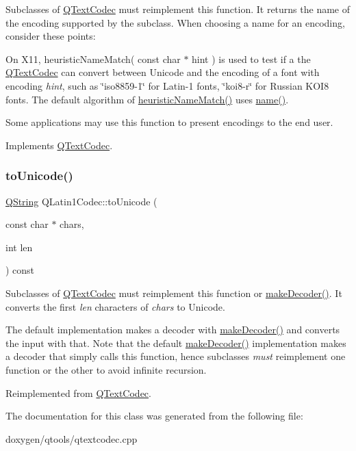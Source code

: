 Subclasses of \mbox{\hyperlink{class_q_text_codec}{Q\+Text\+Codec}} must reimplement this function. It returns the name of the encoding supported by the subclass. When choosing a name for an encoding, consider these points\+: 
\begin{DoxyItemize}
\item On X11, heuristic\+Name\+Match( const char $\ast$ hint ) is used to test if a the \mbox{\hyperlink{class_q_text_codec}{Q\+Text\+Codec}} can convert between Unicode and the encoding of a font with encoding {\itshape hint}, such as \char`\"{}iso8859-\/1\char`\"{} for Latin-\/1 fonts, \char`\"{}koi8-\/r\char`\"{} for Russian K\+O\+I8 fonts. The default algorithm of \mbox{\hyperlink{class_q_latin1_codec_a34f0298855e849d6c4bd67a7115971ec}{heuristic\+Name\+Match()}} uses \mbox{\hyperlink{class_q_latin1_codec_ae85de05cd63fcb55c7fddceeb9d524d8}{name()}}. 
\item Some applications may use this function to present encodings to the end user. 
\end{DoxyItemize}

Implements \mbox{\hyperlink{class_q_text_codec_a5b735ce19dc6b0fb0e8858bd3f54f0e2}{Q\+Text\+Codec}}.

\mbox{\label{class_q_latin1_codec_a2445e543d9ddb637f8f94df3c1931a73}} 
\subsubsection{\texorpdfstring{toUnicode()}{toUnicode()}}
{\footnotesize\ttfamily \mbox{\hyperlink{class_q_string}{Q\+String}} Q\+Latin1\+Codec\+::to\+Unicode (\begin{DoxyParamCaption}\item[{const char $\ast$}]{chars,  }\item[{int}]{len }\end{DoxyParamCaption}) const\hspace{0.3cm}{\ttfamily [virtual]}}

Subclasses of \mbox{\hyperlink{class_q_text_codec}{Q\+Text\+Codec}} must reimplement this function or \mbox{\hyperlink{class_q_text_codec_abb65882aa316a2ad49a10e9f86c4dc88}{make\+Decoder()}}. It converts the first {\itshape len} characters of {\itshape chars} to Unicode.

The default implementation makes a decoder with \mbox{\hyperlink{class_q_text_codec_abb65882aa316a2ad49a10e9f86c4dc88}{make\+Decoder()}} and converts the input with that. Note that the default \mbox{\hyperlink{class_q_text_codec_abb65882aa316a2ad49a10e9f86c4dc88}{make\+Decoder()}} implementation makes a decoder that simply calls this function, hence subclasses {\itshape must} reimplement one function or the other to avoid infinite recursion. 

Reimplemented from \mbox{\hyperlink{class_q_text_codec_aafe2c454ae7cbbf3d84a7ca26f775c49}{Q\+Text\+Codec}}.



The documentation for this class was generated from the following file\+:\begin{DoxyCompactItemize}
\item 
doxygen/qtools/qtextcodec.\+cpp\end{DoxyCompactItemize}
